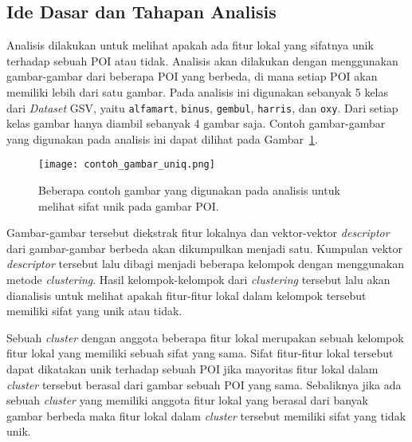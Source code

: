 \subsection{Ide Dasar dan Tahapan Analisis}
Analisis dilakukan untuk melihat apakah ada fitur lokal yang sifatnya unik terhadap sebuah POI atau tidak. Analisis akan dilakukan dengan menggunakan gambar-gambar dari beberapa POI yang berbeda, di mana setiap POI akan memiliki lebih dari satu gambar. Pada analisis ini digunakan sebanyak 5 kelas dari \textit{Dataset} GSV, yaitu \texttt{alfamart}, \texttt{binus}, \texttt{gembul}, \texttt{harris}, dan \texttt{oxy}. Dari setiap kelas gambar hanya diambil sebanyak 4 gambar saja. Contoh gambar-gambar yang digunakan pada analisis ini dapat dilihat pada Gambar~\ref{fig:analisis_uniqueness}. 
\begin{figure}[H]
	\centering
	\texttt{[image: contoh\_gambar\_uniq.png]}	
	\caption{Beberapa contoh gambar yang digunakan pada analisis untuk melihat sifat unik pada gambar POI.}
	\label{fig:analisis_uniqueness}
\end{figure}

Gambar-gambar tersebut diekstrak fitur lokalnya dan vektor-vektor \textit{descriptor} dari gambar-gambar berbeda akan dikumpulkan menjadi satu. Kumpulan vektor \textit{descriptor} tersebut lalu dibagi menjadi beberapa kelompok dengan menggunakan metode \textit{clustering}. Hasil kelompok-kelompok dari \textit{clustering} tersebut lalu akan dianalisis untuk melihat apakah fitur-fitur lokal dalam kelompok tersebut memiliki sifat yang unik atau tidak.

Sebuah \textit{cluster} dengan anggota beberapa fitur lokal merupakan sebuah kelompok fitur lokal yang memiliki sebuah sifat yang sama. Sifat fitur-fitur lokal tersebut dapat dikatakan unik terhadap sebuah POI jika mayoritas fitur lokal dalam \textit{cluster} tersebut berasal dari gambar sebuah POI yang sama. Sebaliknya jika ada sebuah \textit{cluster} yang memiliki anggota fitur lokal yang berasal dari banyak gambar berbeda maka fitur lokal dalam \textit{cluster} tersebut memiliki sifat yang tidak unik.

